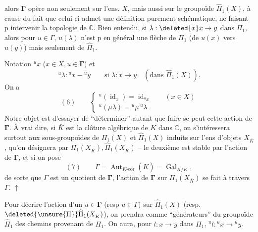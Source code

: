 alors $\mathbf{\Gamma}$ opère non seulement sur  l'ens. $X$, mais aussi sur le groupoïde $\widehat\Pi_1(X)$, à cause du fait que celui-ci admet une définition purement schématique, ne faisant p intervenir la topologie de $\mathbb C$. Bien entendu, si $\lambda:\deleted{x} x\to y$ dans $\Pi_1$, alors pour $u\in\Gamma$, $u(\lambda)$ n'est p en général une flèche de $\Pi_1$ (de $u(x)$ vers $u(y)$) mais seulement de $\widehat\Pi_1$.

 Notation ${}^ux$ ($x\in X,u\in\mathbf{\Gamma}$) et 
\[
{}^u\lambda:{}^ux-{}^uy\qquad\text{si }\lambda:x\to y\quad(\text{dans }\widehat\Pi_1(X)).
\]
On a
\[
(6)\qquad\begin{cases}
{}^u(\operatorname{id}_x)=\operatorname{id}_{{}^ux}\qquad(x\in X)\\
{}^u(\mu\lambda)={}^u\mu\,{}^u\lambda
\end{cases}
\]
Notre objet est d'essayer de ``déterminer'' autant que faire se peut cette action de $\mathbf{\Gamma}$. À vrai dire, si $\bar K$ est la clôture algébrique de $K$ dans $\mathbb C$, on s'intéressera surtout aux sous-groupoïdes de $\Pi_1(X)$ et $\widehat\Pi_1(X)$ induits sur l'ens d'objets $X_{\bar K}$, qu'on désignera par $\Pi_1(X_{\bar K}),\widehat\Pi_1(X_{\bar K})$ -- le deuxième est stable par l'action de $\mathbf{\Gamma}$, et si on pose
\[
(7)\qquad\Gamma=\operatorname{Aut}_{K\text{-cor}}(\bar K)=\operatorname{Gal}_{\bar K/K},
\]
de sorte que $\Gamma$ est un quotient de $\mathbf{\Gamma}$, l'action de $\mathbf{\Gamma}$ sur $\Pi_1(X_{\bar K})$ se fait à travers $\Gamma$. $\uparrow$

Pour décrire l'action d'un $u\in\mathbf{\Gamma}$ (resp $u\in\Gamma$) sur $\widehat\Pi_1(X)$ (resp. $\deleted{\unsure{\Pi}}\widehat\Pi_1(X_{\bar K})$), on prendra comme ``générateurs'' du groupoïde $\widehat\Pi_1$ des chemins provenant de $\Pi_1$. On aura, pour ${l}:x\to y$ dans $\Pi_1$, ${}^u{l}:{}^ux\to{}^uy$.

